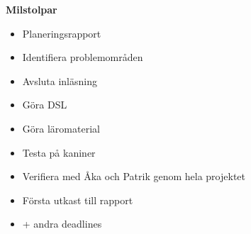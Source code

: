 \documentclass[12pt,a4paper]{scrartcl}
\begin{document}
\textbf{Milstolpar}

\begin{itemize}
    \item Planeringsrapport
    \item Identifiera problemområden
    \item Avsluta inläsning
    \item Göra DSL
    \item Göra läromaterial
    \item Testa på kaniner
    \item Verifiera med  Åka och Patrik genom hela projektet
    \item Första utkast till rapport
    \item + andra deadlines
\end{itemize}
\end{document}
